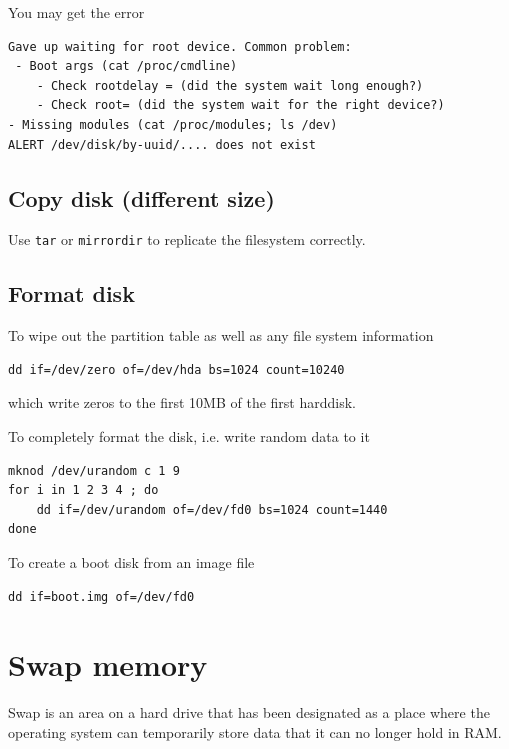 \begin{enumerate}
You may get the error
\begin{verbatim}
Gave up waiting for root device. Common problem:
 - Boot args (cat /proc/cmdline)
    - Check rootdelay = (did the system wait long enough?)
    - Check root= (did the system wait for the right device?)
- Missing modules (cat /proc/modules; ls /dev)
ALERT /dev/disk/by-uuid/.... does not exist    
\end{verbatim}
\end{enumerate}




\subsection{Copy disk (different size)}

Use \verb!tar! or \verb!mirrordir! to replicate the filesystem correctly.




\subsection{Format disk}

To wipe out the partition table as well as any file system information 
\begin{verbatim}
dd if=/dev/zero of=/dev/hda bs=1024 count=10240
\end{verbatim}
which write zeros to the first 10MB of the first harddisk.

To completely format the disk, i.e. write random data to it
\begin{verbatim}
mknod /dev/urandom c 1 9
for i in 1 2 3 4 ; do
    dd if=/dev/urandom of=/dev/fd0 bs=1024 count=1440
done
\end{verbatim}

To create a boot disk from an image file
\begin{verbatim}
dd if=boot.img of=/dev/fd0
\end{verbatim}

\section{Swap memory}
\label{sec:swap_memory}

Swap is an area on a hard drive that has been designated as a place where the
operating system can temporarily store data that it can no longer hold in RAM.


